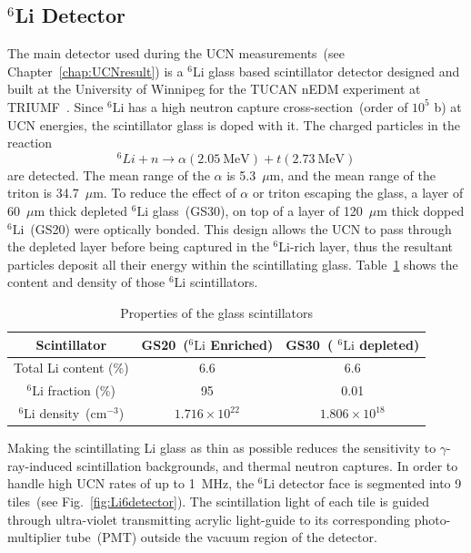 \subsection{$^6$Li Detector\label{sec:Li6detector}}
The main detector used during the UCN measurements~(see
Chapter~\ref{chap:UCNresult}) is a $^6\mathrm{Li}$ glass based
scintillator detector designed and built at the University of Winnipeg
for the TUCAN nEDM experiment at
TRIUMF~\cite{jamieson2017characterization, Lori}. Since
$^6\mathrm{Li}$ has a high neutron capture cross-section~(order of
$10^5$ b) at UCN energies, the scintillator glass is doped with
it. The charged particles in the reaction
\begin{equation}
^6Li + n \rightarrow \alpha (2.05~\mathrm{MeV}) + t (2.73~\mathrm{MeV})
\end{equation}
are detected. The mean range of the $\alpha$ is 5.3~$\mu$m, and the
mean range of the triton is 34.7~$\mu$m. To reduce the effect of
$\alpha$ or triton escaping the glass, a layer of 60~$\mu$m thick
depleted $^6\mathrm{Li}$ glass~(GS30), on top of a layer of 120~$\mu$m
thick dopped $^6\mathrm{Li}$~(GS20) were optically bonded. This design
allows the UCN to pass through the depleted layer before being
captured in the $^6$Li-rich layer, thus the resultant particles
deposit all their energy within the scintillating
glass. Table~\ref{tab:scintillator} shows the content and density of
those $^6\mathrm{Li}$ scintillators.

\begin{table}[h!]
  \centering
  \begin{tabular}{|c|c|c|}
    \hline
    Scintillator & GS20~($^6\mathrm{Li}$ Enriched) & GS30~( $^6\mathrm{Li}$ depleted) \\
    \hline
    Total Li content (\%) & 6.6 & 6.6 \\
    \hline
    $^6\mathrm{Li}$ fraction (\%) & 95 & 0.01 \\
    \hline
    $^6\mathrm{Li}$ density~(cm$^{-3}$) & $1.716 \times 10^{22}$ & $1.806 \times 10^{18}$ \\
    \hline
  \end{tabular}
  \caption{Properties of the glass
    scintillators\label{tab:scintillator}}
\end{table}


Making the scintillating Li glass as thin as possible reduces the
sensitivity to $\gamma$-ray-induced scintillation backgrounds, and
thermal neutron captures. In order to handle high UCN rates of up to
1~MHz, the $^6\mathrm{Li}$ detector face is segmented into 9
tiles~(see Fig.~\ref{fig:Li6detector}). The scintillation light of
each tile is guided through ultra-violet transmitting acrylic
light-guide to its corresponding photo-multiplier tube~(PMT) outside
the vacuum region of the detector.

